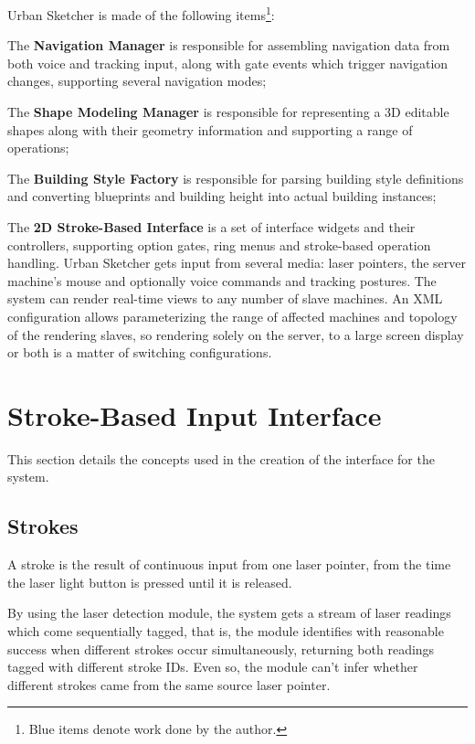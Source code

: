 Urban Sketcher is made of the following items\footnote{Blue items denote work done by the author.}:

The \textbf{Navigation Manager} is
		responsible for assembling navigation data from
		both voice and tracking input, along with gate events which trigger navigation changes,
		supporting several navigation modes;
	
The \textbf{Shape Modeling Manager} is
		responsible for representing a 3D editable shapes
		along with their geometry information and supporting a range of operations;
	
The \textbf{Building Style Factory} is
		responsible for parsing building style definitions
		and converting blueprints and building height into actual building instances;
	
The \textbf{2D Stroke-Based Interface} is 
		a set of interface widgets and their controllers,
		supporting option gates, ring menus and stroke-based operation handling.
Urban Sketcher gets input from several media:
laser pointers, the server machine's mouse and optionally voice commands and tracking postures.
The system can render real-time views to any number of slave machines.
An XML configuration allows parameterizing the range of affected machines and topology of the rendering slaves,
so rendering solely on the server, to a large screen display or both is a matter of switching configurations.


\section{Stroke-Based Input Interface}

This section details the concepts used in the creation of the interface for the system.

\subsection{Strokes}

A stroke is the result of continuous input from one laser pointer, from the time the laser
light button is pressed until it is released. 

By using the laser detection module, the system gets a stream of laser readings which
come sequentially tagged, that is, the module identifies with reasonable success when different strokes
occur simultaneously, returning both readings tagged with different stroke IDs.
Even so, the module can't infer whether different strokes came from the same source laser pointer.

